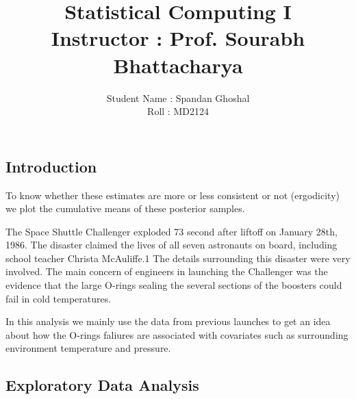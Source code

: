 \documentclass[11pt,english]{article}\usepackage[]{graphicx}\usepackage[]{xcolor}
\begin{document}
\title{Statistical Computing I\\
Instructor : Prof. Sourabh Bhattacharya}
\author{Student Name : Spandan Ghoshal\\
Roll : MD2124}
\maketitle

\subsection*{Introduction}

To know whether these estimates are more or less consistent or not
(ergodicity) we plot the cumulative means of these posterior samples.

The Space Shuttle Challenger exploded 73 second after liftoff on January
28th, 1986. The disaster claimed the lives of all seven astronauts
on board, including school teacher Christa McAuliffe.1 The details
surrounding this disaster were very involved. The main concern of
engineers in launching the Challenger was the evidence that the large
O-rings sealing the several sections of the boosters could fail in
cold temperatures.

In this analysis we mainly use the data from previous launches to
get an idea about how the O-rings faliures are associated with covariates
such as surrounding environment temperature and pressure. 

\subsection*{Exploratory Data Analysis}
\end{document}
